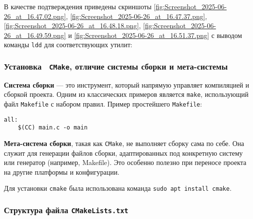 В качестве подтверждения приведены скриншоты \ref{fig:Screenshot_2025-06-26_at_16.47.02.png}, \ref{fig:Screenshot_2025-06-26_at_16.47.37.png}, \ref{fig:Screenshot_2025-06-26_at_16.48.18.png}, \ref{fig:Screenshot_2025-06-26_at_16.49.59.png} и \ref{fig:Screenshot_2025-06-26_at_16.51.37.png} с выводом команды \texttt{ldd} для соответствующих утилит:






\subsubsection{Установка  \texttt{CMake}, отличие системы сборки и мета-системы}

\textbf{Система сборки} — это инструмент, который напрямую управляет компиляцией и сборкой проекта. Одним из классических примеров является \texttt{make}, использующий файл \texttt{Makefile} с набором правил. Пример простейшего \texttt{Makefile}:

\begin{verbatim}
all:
	$(CC) main.c -o main
\end{verbatim}

\textbf{Мета-система сборки}, такая как \texttt{CMake}, не выполняет сборку сама по себе. Она служит для генерации файлов сборки, адаптированных под конкретную систему или генератор (например, Makefile). Это особенно полезно при переносе проекта на другие платформы и конфигурации.

Для установки \texttt{cmake} была использована команда \texttt{sudo apt install cmake}.


\subsubsection*{Структура файла \texttt{CMakeLists.txt}}

